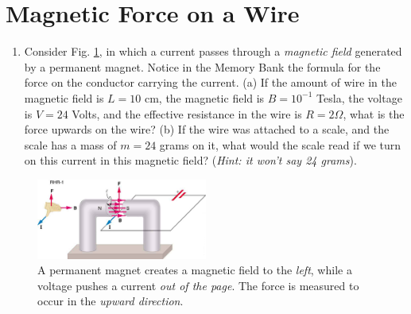 \documentclass{article}
\begin{document}
\section{Magnetic Force on a Wire}

\begin{enumerate}
\item Consider Fig. \ref{fig:1}, in which a current passes through a \textit{magnetic field} generated by a permanent magnet.  Notice in the Memory Bank the formula for the force on the conductor carrying the current.  (a) If the amount of wire in the magnetic field is $L = 10$ cm, the magnetic field is $B = 10^{-1}$ Tesla, the voltage is $V = 24$ Volts, and the effective resistance in the wire is $R = 2\Omega$, what is the force upwards on the wire? (b)  If the wire was attached to a scale, and the scale has a mass of $m = 24$ grams on it, what would the scale read if we turn on this current in this magnetic field?  (\textit{Hint: it won't say 24 grams}).
\end{enumerate}

\begin{figure}
\centering
\includegraphics[width=0.5\textwidth]{figures/force.jpeg}
\caption{\label{fig:1} A permanent magnet creates a magnetic field to the \textit{left}, while a voltage pushes a current \textit{out of the page}.  The force is measured to occur in the \textit{upward direction}.}
\end{figure}
\end{document}
